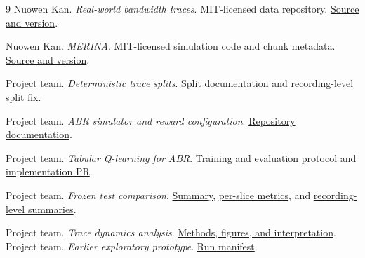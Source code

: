 \documentclass[10pt,letterpaper]{article}
\begin{document}
\begin{thebibliography}{9}
Nuowen Kan. \emph{Real-world bandwidth traces}. MIT-licensed data repository.
\href{https://github.com/confiwent/Real-world-bandwidth-traces/tree/d28c4fd48d0e358db024cc0217b111c070815fa7}{Source and version}.

Nuowen Kan. \emph{MERINA}. MIT-licensed simulation code and chunk metadata.
\href{https://github.com/confiwent/merina/tree/dfd01b7f664e3a9fa0d123945081f7af2ebb31f7}{Source and version}.

Project team. \emph{Deterministic trace splits}.
\href{https://github.com/Bobby-Zhu/abr-q-learning/blob/2169df2/data/splits/README.md}{Split documentation} and
\href{https://github.com/Bobby-Zhu/abr-q-learning/pull/1}{recording-level split fix}.

Project team. \emph{ABR simulator and reward configuration}.
\href{https://github.com/Bobby-Zhu/abr-q-learning/blob/2169df2/docs/SIMULATOR.md}{Repository documentation}.

Project team. \emph{Tabular Q-learning for ABR}.
\href{https://github.com/Bobby-Zhu/abr-q-learning/blob/2169df2/docs/Q_LEARNING.md}{Training and evaluation protocol} and
\href{https://github.com/Bobby-Zhu/abr-q-learning/pull/2}{implementation PR}.

Project team. \emph{Frozen test comparison}.
\href{https://github.com/Bobby-Zhu/abr-q-learning/blob/2169df2/results/final/test/summary.md}{Summary},
\href{https://github.com/Bobby-Zhu/abr-q-learning/blob/2169df2/results/final/test/per_trace.csv}{per-slice metrics}, and
\href{https://github.com/Bobby-Zhu/abr-q-learning/blob/2169df2/results/trace_dynamics/per_recording.csv}{recording-level summaries}.

Project team. \emph{Trace dynamics analysis}.
\href{https://github.com/Bobby-Zhu/abr-q-learning/blob/2169df2/docs/TRACE_DYNAMICS.md}{Methods, figures, and interpretation}.
Project team. \emph{Earlier exploratory prototype}.
\href{https://github.com/Bobby-Zhu/abr-q-learning/blob/1c8251acc07a97f89b18e78ff958b8d3b061339e/prototype/results/run_01/manifest.csv}{Run manifest}.
\end{thebibliography}
\end{document}
